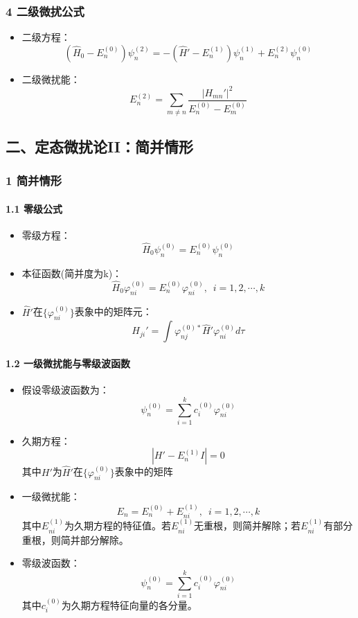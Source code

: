 \documentclass[UTF8,twocolumn]{ctexart}
\providecommand{\tightlist}{%
  \setlength{\itemsep}{0pt}\setlength{\parskip}{0pt}}
\let\oldparagraph\paragraph
\renewcommand{\paragraph}[1]{\oldparagraph{#1}\mbox{}}
\begin{document}
\subsubsection{4
二级微扰公式}\label{ux4e8cux7ea7ux5faeux6270ux516cux5f0f}

\begin{itemize}
\tightlist
\item
  二级方程：
  \[(\hat{H}_0-E_n^{(0)})\psi_n^{(2)}=-(\hat{H}'-E_n^{(1)})\psi_n^{(1)}+E_n^{(2)}\psi_n^{(0)}\]
\item
  二级微扰能：
  \[E_n^{(2)}=\sum_{m\neq n}\frac{|H_{mn}'|^2}{E_n^{(0)}-E_m^{(0)}}\]
\end{itemize}

\subsection{二、定态微扰论II：简并情形}\label{ux4e8cux5b9aux6001ux5faeux6270ux8bbaiiux7b80ux5e76ux60c5ux5f62}

\subsubsection{1 简并情形}\label{ux7b80ux5e76ux60c5ux5f62}

\paragraph{ 1.1 零级公式}\label{ux96f6ux7ea7ux516cux5f0f-1}

\begin{itemize}
\tightlist
\item
  零级方程： \[\hat{H}_0\psi_n^{(0)}=E_n^{(0)}\psi_n^{(0)}\]
\item
  本征函数(简并度为k)：
  \[\hat{H}_0\varphi_{ni}^{(0)}=E_n^{(0)}\varphi_{ni}^{(0)},\,\,\,i=1,2,\cdots,k\]
\item
  \(\hat{H}'\)在\(\{\varphi_{ni}^{(0)}\}\)表象中的矩阵元：
  \[H_{ji}'=\int\varphi_{nj}^{(0)*}\hat{H}'\varphi_{ni}^{(0)}d\tau\]
\end{itemize}

\paragraph{ 1.2
一级微扰能与零级波函数}\label{ux4e00ux7ea7ux5faeux6270ux80fdux4e0eux96f6ux7ea7ux6ce2ux51fdux6570}

\begin{itemize}
\tightlist
\item
  假设零级波函数为：
  \[\psi_n^{(0)}=\sum_{i=1}^kc_i^{(0)}\varphi_{ni}^{(0)}\]
\item
  久期方程： \[|H'-E_n^{(1)}I|=0\]
  其中\(H'\)为\(\hat{H}'\)在\(\{\varphi_{ni}^{(0)}\}\)表象中的矩阵
\item
  一级微扰能： \[E_n=E_n^{(0)}+E_{ni}^{(1)},\,\,\,i=1,2,\cdots,k\]
  其中\(E_{ni}^{(1)}\)为久期方程的特征值。若\(E_{ni}^{(1)}\)无重根，则简并解除；若\(E_{ni}^{(1)}\)有部分重根，则简并部分解除。
\item
  零级波函数： \[\psi_n^{(0)}=\sum_{i=1}^kc_i^{(0)}\varphi_{ni}^{(0)}\]
  其中\(c_i^{(0)}\)为久期方程特征向量的各分量。
\end{itemize}
\end{document}
